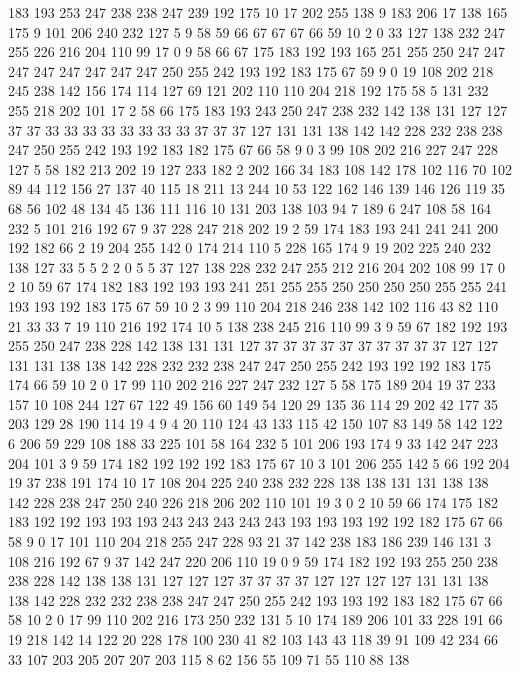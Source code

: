 183 193 253 247 238 238 247 239 192 175 10 17 202 255 138 9 183 206 17 138
165 175 9 101 206 240 232 127 5 9 58 59 66 67 67 67 66 59 10 2
0 33 127 138 232 247 255 226 216 204 110 99 17 0 9 58 66 67 175 183
192 193 165 251 255 250 247 247 247 247 247 247 247 247 250 255 242 193 192 183
175 67 59 9 0 19 108 202 218 245 238 142 156 174 114 127 69 121 202 110
110 204 218 192 175 58 5 131 232 255 218 202 101 17 2 58 66 175 183 193
243 250 247 238 232 142 138 131 127 127 37 37 33 33 33 33 33 33 33 33
37 37 37 127 131 131 138 142 142 228 232 238 238 247 250 255 242 193 192 183
182 175 67 66 58 9 0 3 99 108 202 216 227 247 228 127 5 58 182 213
202 19 127 233 182 2 202 166 34 183 108 142 178 102 116 70 102 89 44 112
156 27 137 40 115 18 211 13 244 10 53 122 162 146 139 146 126 119 35 68
56 102 48 134 45 136 111 116 10 131 203 138 103 94 7 189 6 247 108 58
164 232 5 101 216 192 67 9 37 228 247 218 202 19 2 59 174 183 193 241
241 241 200 192 182 66 2 19 204 255 142 0 174 214 110 5 228 165 174 9
19 202 225 240 232 138 127 33 5 5 2 2 0 5 5 37 127 138 228 232
247 255 212 216 204 202 108 99 17 0 2 10 59 67 174 182 183 192 193 193
241 251 255 255 250 250 250 250 255 255 241 193 193 192 183 175 67 59 10 2
3 99 110 204 218 246 238 142 102 116 43 82 110 21 33 33 7 19 110 216
192 174 10 5 138 238 245 216 110 99 3 9 59 67 182 192 193 255 250 247
238 228 142 138 131 131 127 37 37 37 37 37 37 37 37 37 37 127 127 131
131 138 138 142 228 232 232 238 247 247 250 255 242 193 192 192 183 175 174 66
59 10 2 0 17 99 110 202 216 227 247 232 127 5 58 175 189 204 19 37
233 157 10 108 244 127 67 122 49 156 60 149 54 120 29 135 36 114 29 202
42 177 35 203 129 28 190 114 19 4 9 4 20 110 124 43 133 115 42 150
107 83 149 58 142 122 6 206 59 229 108 188 33 225 101 58 164 232 5 101
206 193 174 9 33 142 247 223 204 101 3 9 59 174 182 192 192 192 183 175
67 10 3 101 206 255 142 5 66 192 204 19 37 238 191 174 10 17 108 204
225 240 238 232 228 138 138 131 131 138 138 142 228 238 247 250 240 226 218 206
202 110 101 19 3 0 2 10 59 66 174 175 182 183 192 192 193 193 193 243
243 243 243 243 193 193 193 192 192 182 175 67 66 58 9 0 17 101 110 204
218 255 247 228 93 21 37 142 238 183 186 239 146 131 3 108 216 192 67 9
37 142 247 220 206 110 19 0 9 59 174 182 192 193 255 250 238 238 228 142
138 138 131 127 127 127 37 37 37 37 127 127 127 127 131 131 138 138 142 228
232 232 238 238 247 247 250 255 242 193 193 192 183 182 175 67 66 58 10 2
0 17 99 110 202 216 173 250 232 131 5 10 174 189 206 101 33 228 191 66
19 218 142 14 122 20 228 178 100 230 41 82 103 143 43 118 39 91 109 42
234 66 33 107 203 205 207 207 203 115 8 62 156 55 109 71 55 110 88 138
